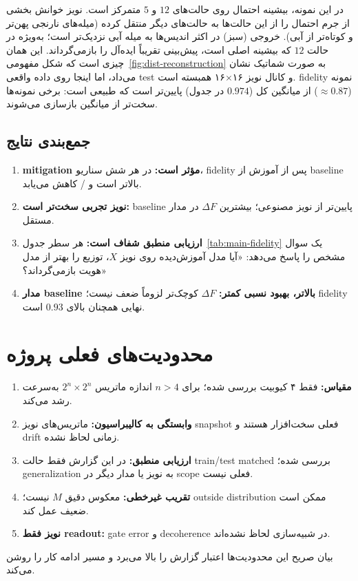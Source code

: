 در این نمونه، بیشینه احتمال روی حالت‌های $12$ و $5$ متمرکز است. نویز خوانش بخشی از جرم احتمال را از این حالت‌ها به حالت‌های دیگر منتقل کرده (میله‌های نارنجی پهن‌تر و کوتاه‌تر از آبی). خروجی  (سبز) در اکثر اندیس‌ها به میله آبی نزدیک‌تر است؛ به‌ویژه در حالت $12$ که بیشینه اصلی است، پیش‌بینی تقریباً ایده‌آل را بازمی‌گرداند. این همان چیزی است که شکل مفهومی~\ref{fig:dist-reconstruction} به صورت شماتیک نشان می‌داد، اما اینجا روی داده واقعی test و کانال نویز ۱۶$\times$۱۶ همبسته است. fidelity نمونه ($\approx 0.87$) از میانگین کل ($0.974$ در جدول) پایین‌تر است که طبیعی است: برخی نمونه‌ها سخت‌تر از میانگین بازسازی می‌شوند.

\subsection{جمع‌بندی نتایج}

\begin{enumerate}
	\item \textbf{mitigation مؤثر است:} در هر شش سناریو، fidelity پس از آموزش از baseline بالاتر است و / کاهش می‌یابد.
	\item \textbf{نویز تجربی سخت‌تر است:} baseline پایین‌تر از نویز مصنوعی؛ بیشترین $\Delta F$ در مدار مستقل.
	\item \textbf{ارزیابی منطبق شفاف است:} هر سطر جدول~\ref{tab:main-fidelity} یک سوال مشخص را پاسخ می‌دهد: «آیا مدل آموزش‌دیده روی نویز $X$، توزیع را بهتر از مدل هویت بازمی‌گرداند؟»
	\item \textbf{مدار  baseline بالاتر، بهبود نسبی کمتر:} $\Delta F$ کوچک‌تر لزوماً ضعف نیست؛ fidelity نهایی همچنان بالای $0.93$ است.
\end{enumerate}

\section{محدودیت‌های فعلی پروژه}

\begin{enumerate}
	\item \textbf{مقیاس:} فقط ۴ کیوبیت بررسی شده؛ برای $n>4$ اندازه ماتریس $2^n\times2^n$ به‌سرعت رشد می‌کند.
	\item \textbf{وابستگی به کالیبراسیون:} ماتریس‌های نویز snapshot فعلی سخت‌افزار هستند و drift زمانی لحاظ نشده.
	\item \textbf{ارزیابی منطبق:} در این گزارش فقط حالت train/test matched بررسی شده؛ generalization به نویز یا مدار دیگر در scope فعلی نیست.
	\item \textbf{تقریب غیرخطی:}  معکوس دقیق $M$ نیست؛ outside distribution ممکن است ضعیف عمل کند.
	\item \textbf{نویز فقط readout:} gate error و decoherence در شبیه‌سازی لحاظ نشده‌اند.
\end{enumerate}
بیان صریح این محدودیت‌ها اعتبار گزارش را بالا می‌برد و مسیر ادامه کار را روشن می‌کند.


